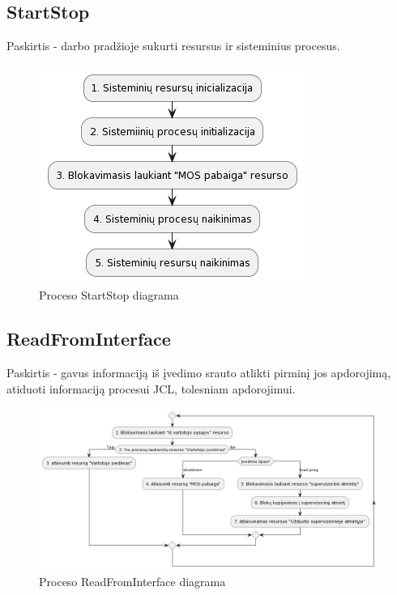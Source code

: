 \documentclass{VUMIFInfKursinis}
\begin{document}
\subsection{StartStop}

Paskirtis - darbo pradžioje sukurti resursus ir sisteminius procesus.

\begin{figure}[H]
	\centering	
	\includegraphics[scale=0.65]{img/StartStop}
	\caption{Proceso StartStop diagrama}   %
	\label{img:StartStop}
\end{figure}

\subsection{ReadFromInterface}

Paskirtis - gavus informaciją iš įvedimo srauto atlikti pirminį jos apdorojimą, atiduoti informaciją procesui JCL, tolesniam apdorojimui.

\begin{figure}[H]
	\centering	
	\includegraphics[scale=0.40]{img/ReadFromInterface}
	\caption{Proceso ReadFromInterface diagrama}   %
	\label{img:ReadFromInterface}
\end{figure}
\end{document}
